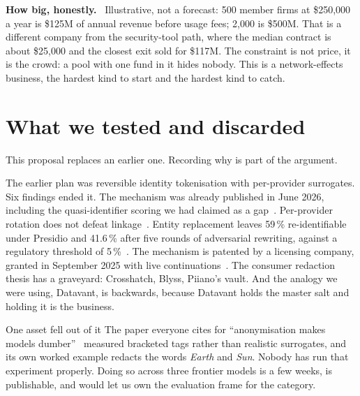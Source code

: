 \documentclass[9pt,twocolumn,a4paper]{extarticle}
\newcommand{\para}[1]{\vspace{3pt}\textbf{#1}\ }
\begin{document}
\para{How big, honestly.} Illustrative, not a forecast: 500 member firms at \$250{,}000 a year is \$125M of annual revenue before usage fees; 2{,}000 is \$500M. That is a different company from the security-tool path, where the median contract is about \$25{,}000 and the closest exit sold for \$117M. The constraint is not price, it is the crowd: a pool with one fund in it hides nobody. This is a network-effects business, the hardest kind to start and the hardest kind to catch.

\section{What we tested and discarded}
This proposal replaces an earlier one. Recording why is part of the argument.

The earlier plan was reversible identity tokenisation with per-provider surrogates. Six findings ended it. The mechanism was already published in June 2026, including the quasi-identifier scoring we had claimed as a gap~\cite{surrogate}. Per-provider rotation does not defeat linkage~\cite{lermen}. Entity replacement leaves 59\,\% re-identifiable under Presidio and 41.6\,\% after five rounds of adversarial rewriting, against a regulatory threshold of 5\,\%~\cite{rat}. The mechanism is patented by a licensing company, granted in September 2025 with live continuations~\cite{anonos}. The consumer redaction thesis has a graveyard: Crosshatch, Blyss, Piiano's vault. And the analogy we were using, Datavant, is backwards, because Datavant holds the master salt and holding it is the business.

\begin{callout}[teal]{One asset fell out of it}
The paper everyone cites for ``anonymisation makes models dumber''~\cite{deusser} measured bracketed tags rather than realistic surrogates, and its own worked example redacts the words \emph{Earth} and \emph{Sun}. Nobody has run that experiment properly. Doing so across three frontier models is a few weeks, is publishable, and would let us own the evaluation frame for the category.
\end{callout}

\end{document}
